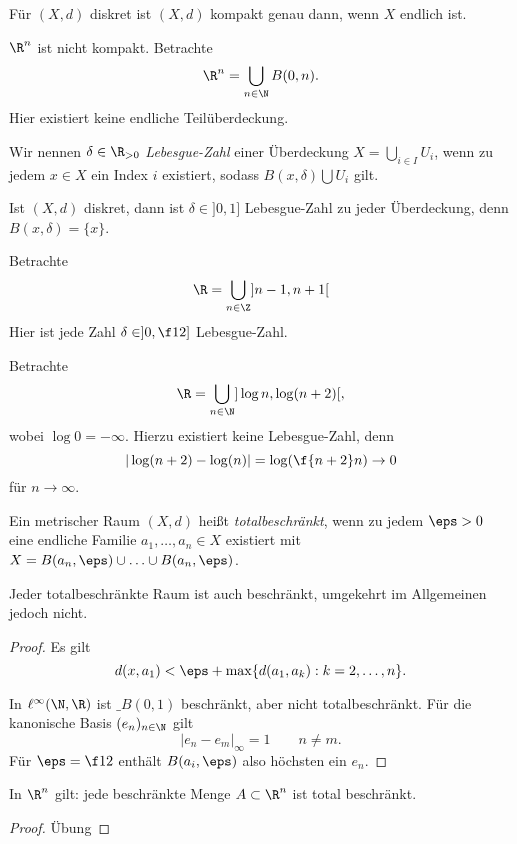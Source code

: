 \begin{ex}
	Für $(X,d)$ diskret ist $(X,d)$ kompakt genau dann, wenn $X$ endlich ist.

	$\R^n$ ist nicht kompakt.
	Betrachte
	\[
		\R^n = \bigcup_{n\in \N} B(0,n).
	\]
	Hier existiert keine endliche Teilüberdeckung.
\end{ex}

\begin{df}
	Wir nennen $\delta \in \R_{>0}$ \emph{Lebesgue-Zahl} einer Überdeckung $X = \bigcup_{i\in I} U_i$,  wenn zu jedem $x \in X$ ein Index $i$ existiert, sodass $B(x,\delta) \bigcup U_i$ gilt.
\end{df}

\begin{ex}
	Ist $(X,d)$ diskret, dann ist $\delta \in ]0,1]$ Lebesgue-Zahl zu jeder Überdeckung, denn $B(x,\delta) = \{x\}$.

	Betrachte
	\[
		\R = \bigcup_{n \in \Z} ]n-1, n+1[
	\]
	Hier ist jede Zahl $\delta \in ]0,\f 12]$ Lebesgue-Zahl.

	Betrachte
	\[
		\R = \bigcup_{n\in\N} ] \log n, \log(n+2) [,
	\]
	wobei $\log 0 = -\infty$.
	Hierzu existiert keine Lebesgue-Zahl, denn
	\[
		|\log (n+2) - \log(n)| = \log (\f {n+2}n) \to 0
	\]
	für $n \to \infty$.
\end{ex}

\begin{df}
	Ein metrischer Raum $(X,d)$ heißt \emph{totalbeschränkt}, wenn zu jedem $\eps > 0$ eine endliche Familie $a_1, \dotsc, a_n \in X$ existiert mit $X = B(a_n,\eps) \cup \dotsc \cup B(a_n,\eps)$.
\end{df}

\begin{nt}
	Jeder totalbeschränkte Raum ist auch beschränkt, umgekehrt im Allgemeinen jedoch nicht.
	\begin{proof}
		Es gilt
		\[
			d(x,a_1) < \eps + \max \{d(a_1, a_k) : k = 2,\dotsc, n \}.
		\]

		In $\ell^\infty(\N, \R)$ ist $\_B(0,1)$ beschränkt, aber nicht totalbeschränkt.
		Für die kanonische Basis $(e_n)_{n\in \N}$ gilt
		\[
			|e_n - e_m|_\infty = 1
			\qquad n \neq m.
		\]
		Für $\eps = \f 12$ enthält $B(a_i,\eps)$ also höchsten ein $e_n$.
	\end{proof}
\end{nt}

\begin{prop}
	In $\R^n$ gilt: jede beschränkte Menge $A \subset \R^n$ ist total beschränkt.
	\begin{proof}
		Übung
	\end{proof}
\end{prop}

